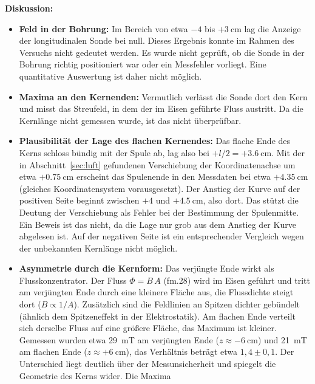 \documentclass[a4paper,11pt]{article}
\begin{document}
\textbf{Diskussion:}
\begin{itemize}
  \item \textbf{Feld in der Bohrung:} Im Bereich von etwa $-4$ bis
        $+\SI{3}{\centi\meter}$ lag die Anzeige der longitudinalen Sonde bei
        null. Dieses Ergebnis konnte im Rahmen des Versuchs nicht gedeutet
        werden. Es wurde nicht geprüft, ob die Sonde in der Bohrung richtig
        positioniert war oder ein Messfehler vorliegt. Eine quantitative
        Auswertung ist daher nicht möglich.
  \item \textbf{Maxima an den Kernenden:} Vermutlich verlässt die Sonde dort
        den Kern und misst das Streufeld, in dem der im Eisen geführte Fluss
        austritt. Da die Kernlänge nicht gemessen wurde, ist das nicht
        überprüfbar.
  \item \textbf{Plausibilität der Lage des flachen Kernendes:} Das flache Ende
        des Kerns schloss bündig mit der Spule ab, lag also bei
        $+l/2=+\SI{3.6}{\centi\meter}$. Mit der in Abschnitt~\ref{sec:luft}
        gefundenen Verschiebung der Koordinatenachse um etwa
        $+\SI{0.75}{\centi\meter}$ erscheint das Spulenende in den Messdaten
        bei etwa $+\SI{4.35}{\centi\meter}$ (gleiches Koordinatensystem
        vorausgesetzt). Der Anstieg der Kurve auf der positiven Seite beginnt
        zwischen $+4$ und $+\SI{4.5}{\centi\meter}$, also dort. Das stützt die
        Deutung der Verschiebung als Fehler bei der Bestimmung der
        Spulenmitte. Ein Beweis ist das nicht, da die Lage nur grob aus dem
        Anstieg der Kurve abgelesen ist. Auf der negativen Seite ist ein
        entsprechender Vergleich wegen der unbekannten Kernlänge nicht möglich.
  \item \textbf{Asymmetrie durch die Kernform:} Das verjüngte Ende wirkt als
        Flusskonzentrator. Der Fluss $\Phi=B\,A$ (fm.28) wird im Eisen geführt
        und tritt am verjüngten Ende durch eine kleinere Fläche aus, die
        Flussdichte steigt dort ($B\propto1/A$). Zusätzlich sind die Feldlinien
        an Spitzen dichter gebündelt (ähnlich dem Spitzeneffekt in der
        Elektrostatik). Am flachen Ende verteilt sich derselbe Fluss auf eine
        größere Fläche, das Maximum ist kleiner. Gemessen wurden etwa
        \SI{29}{\milli\tesla} am verjüngten Ende
        ($z\approx-\SI{6}{\centi\meter}$) und \SI{21}{\milli\tesla} am flachen
        Ende ($z\approx+\SI{6}{\centi\meter}$), das Verhältnis beträgt etwa
        $1{,}4\pm0{,}1$. Der Unterschied liegt deutlich über der
        Messunsicherheit und spiegelt die Geometrie des Kerns wider. Die Maxima

\end{itemize}
\end{document}
